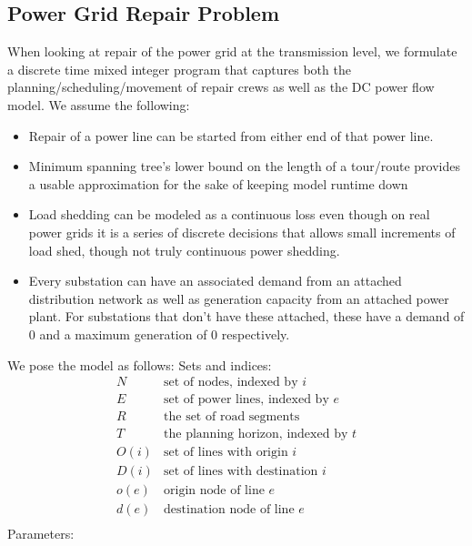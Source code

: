 \documentclass{article}
\begin{document}
	\subsection{Power Grid Repair Problem}
	When looking at repair of the power grid at the transmission level, we formulate a discrete time mixed integer program that captures both the planning/scheduling/movement of repair crews as well as the DC power flow model. We assume the following:
	\begin{itemize}
		\item Repair of a power line can be started from either end of that power line.
		\item Minimum spanning tree's lower bound on the length of a tour/route provides a usable approximation for the sake of keeping model runtime down 
		\item Load shedding can be modeled as a continuous loss even though on real power grids it is a series of discrete decisions that allows small increments of load shed, though not truly continuous power shedding.
		\item Every substation can have an associated demand from an attached distribution network as well as generation capacity from an attached power plant. For substations that don't have these attached, these have a demand of 0 and a maximum generation of 0 respectively.
	\end{itemize}
	We pose the model as follows:
	\newline
	Sets and indices:
	\begin{displaymath}
	\begin{array}{ll}
	N & \mbox{set of nodes, indexed by $i$} \\
	E & \mbox{set of power lines, indexed by $e$}\\
	R & \mbox{the set of road segments} \\
	T & \mbox{the planning horizon, indexed by $t$}  \\
	O(i) & \mbox{set of lines with origin $i$} \\
	D(i) & \mbox{set of lines with destination $i$} \\
	o(e) & \mbox{origin node of line $e$} \\
	d(e) & \mbox{destination node of line $e$} \\
		\end{array}
	\end{displaymath}
	Parameters:
\end{document}
